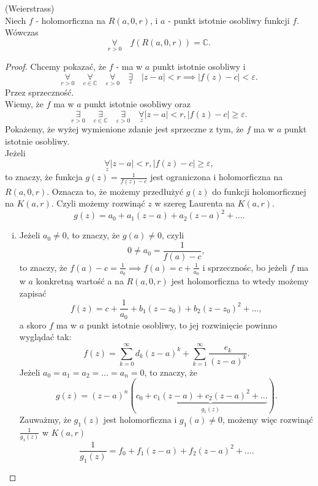 \documentclass[../main.tex]{subfiles}
\begin{document}
\begin{tw}
    (Weierstrass)\\
    Niech $f$ - holomorficzna na $R(a,0,r)$, i $a$ - punkt istotnie osobliwy funkcji $f$. Wówczas
    \[
        \underset{r>0}{\forall} \quad f(R(a,0,r)) = \mathbb{C}
    .\]
\end{tw}
\begin{proof}
    Chcemy pokazać, że $f$ - ma w $a$ punkt istotnie osobliwy i
    \[
        \underset{r > 0}{\forall} \quad \underset{c\in \mathbb{C}}{\forall} \quad \underset{\varepsilon > 0}{\forall} \quad \underset{z}{\exists} \quad \left| z-a \right| < r \implies \left| f(z) - c \right| < \varepsilon
    .\]
Przez sprzeczność.\\
Wiemy, że $f$ ma w $a$ punkt istotnie osobliwy oraz
\[
    \underset{r > 0}{\exists} \quad \underset{c\in\mathbb{C}}{\exists} \quad \underset{\varepsilon > 0}{\exists} \quad \underset{z}{\forall} \left| z-a \right| < r , \left| f(z) - c \right| \ge \varepsilon
.\]
Pokażemy, że wyżej wymienione zdanie jest sprzeczne z tym, że $f$ ma w $a$ punkt istotnie osobliwy.\\
Jeżeli
\[
    \underset{z}{\forall} \left| z - a \right| < r, \left| f(z) - c \right| \ge \varepsilon
,\]
to znaczy, że funkcja $g(z) = \frac{1}{f(z) - c}$ jest ograniczona i holomorficzna na $R(a,0,r)$. Oznacza to, że możemy przedłużyć $g(z)$ do funkcji holomorficznej na $K(a,r)$. Czyli możemy rozwinąć $z$ w szereg Laurenta na $K(a,r)$.
\[
    g(z) = a_0 + a_1(z-a) + a_2(z-a)^2 + \ldots
.\]
\begin{enumerate}[i)]
    \item Jeżeli $a_0 \neq 0$, to znaczy, że $g(a) \neq 0$, czyli
         \[
             0 \neq a_0 = \frac{1}{f(a) - c}
        ,\]
    to znaczy, że $f(a) - c = \frac{1}{a_0} \implies f(a) = c+ \frac{1}{a_0}$ i sprzecznośc, bo jeżeli $f$ ma w $a$ konkretną wartość a na $R(a,0,r)$ jest holomorficzna to wtedy możemy zapisać
        \[
            f(z) = c + \frac{1}{a_0} + b_1(z-z_0) + b_2(z-z_0)^2 + \ldots
        ,\]
    a skoro $f$ ma w $a$ punkt istotnie osobliwy, to jej rozwinięcie powinno wyglądać tak:
        \[
            f(z) = \sum_{k = 0}^{\infty} d_k(z-a)^k + \sum_{k = 1}^{\infty} \frac{e_k}{(z-a)^k}
        .\]
    Jeżeli $a_0 = a_1 = a_2 = \ldots = a_n =  0$, to znaczy, że
        \[
            g(z) = (z-a)^n\left( c_0 + \underbrace{c_1(z-a) + c_2(z-a)^2 + \ldots }_{g_1(z)}\right)
        .\]
    Zauważmy, że $g_1(z)$ jest holomorficzna i $g_1(a) \neq 0$, możemy więc rozwinąć $\frac{1}{g_1(z)}$ w $K(a,r)$
        \[
            \frac{1}{g_1(z)} = f_0 + f_1(z-a) + f_2(z-a)^2 + \ldots
        .\]
\end{enumerate}

\end{proof}
\end{document}
